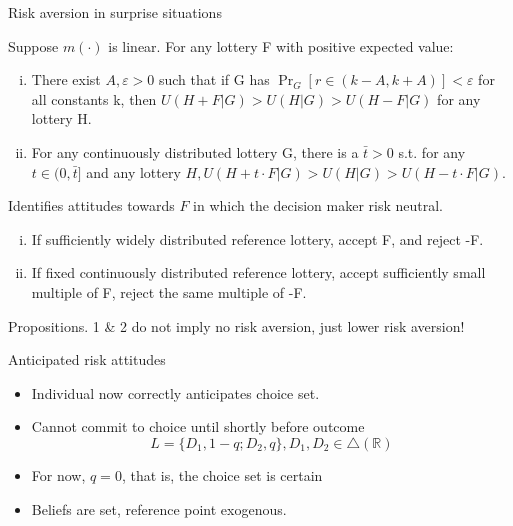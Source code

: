 \begin{frame}{Risk aversion in surprise situations}
    \begin{proposition}
        Suppose $m(\cdot)$ is linear. For any lottery F with positive expected value:
        \begin{enumerate}[(i)]
            \item There exist $A, \varepsilon >0 $ such that if G has $\Pr_G[r \in (k-A, k+A)]< \varepsilon $ for all constants k, then $U(H+F|G)> U(H|G)>U(H-F|G)$ for any lottery H.\medskip
            \item For any continuously distributed lottery G, there is a $\bar{t}>0 $ s.t. for any $t \in (0,\bar{t}]$ and any lottery $H, U(H+t\cdot F|G)> U(H|G)> U(H-t \cdot F|G)$.\medskip
        \end{enumerate}
    \end{proposition}
Identifies attitudes towards $F$ in which the decision maker risk neutral.\medskip
    \begin{enumerate}[(i)]
        \item If sufficiently widely distributed reference lottery, accept F, and reject -F.\medskip
        \item If fixed continuously distributed reference lottery, accept sufficiently small multiple of F, reject the same multiple of -F.\medskip
    \end{enumerate}
Propositions. 1 \& 2 do not imply no risk aversion, just lower risk aversion!
\end{frame}

\begin{frame}{Anticipated risk attitudes}
    \begin{itemize}
        \item Individual now correctly anticipates choice set. \medskip
        \item Cannot commit to choice until shortly before outcome
        \[L=\{D_1,1-q;D_2,q\}, D_1,D_2 \in \bigtriangleup (\mathbb{R})\]
        \item For now, $q=0$, that is, the choice set is certain\medskip
        \item Beliefs are set, reference point exogenous.\medskip
	\end{itemize}
   \end{frame}

